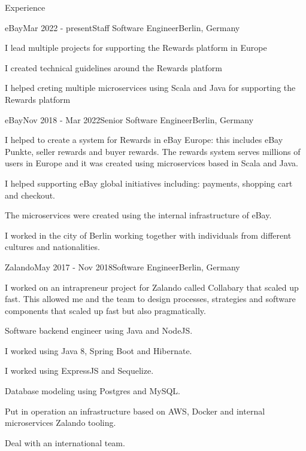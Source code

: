 \documentclass[spanish]{resume}
\begin{document}
\begin{rSection}{Experience}

\begin{rSubsection}{eBay}{Mar 2022 - present}{Staff Software Engineer}{Berlin, Germany}
\item I lead multiple projects for supporting the Rewards platform in Europe
\item I created technical guidelines around the Rewards platform
\item I helped creting multiple microservices using Scala and Java for supporting the Rewards platform


\end{rSubsection}


\begin{rSubsection}{eBay}{Nov 2018 - Mar 2022}{Senior Software Engineer}{Berlin, Germany}
\item I helped to create a system for Rewards in eBay Europe: this includes eBay Punkte, seller rewards and buyer rewards. The rewards system serves millions of users in Europe and it was created using microservices based in Scala and Java.
\item I helped supporting eBay global initiatives including: payments, shopping cart and checkout.
\item The microservices were created using the internal infrastructure of eBay.
\item I worked in the city of Berlin working together with individuals from different cultures and nationalities.
\end{rSubsection}


\begin{rSubsection}{Zalando}{May 2017 - Nov 2018}{Software Engineer}{Berlin, Germany}
\item I worked on an intrapreneur project for Zalando called Collabary that scaled up fast. This allowed me and the team to design processes, strategies and software components that scaled up fast but also pragmatically.
\item Software backend engineer using Java and NodeJS.
\item I worked using Java 8, Spring Boot and Hibernate.
\item I worked using ExpressJS and Sequelize.
\item Database modeling using Postgres and MySQL.
\item Put in operation an infrastructure based on AWS, Docker and internal microservices Zalando tooling.
\item Deal with an international team.
\end{rSubsection}



\end{rSection}
\end{document}
